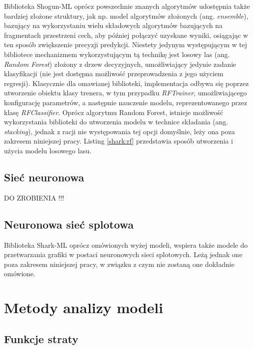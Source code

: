 Biblioteka Shogun-ML oprócz powszechnie znanych algorytmów udostępnia także bardziej złożone struktury, jak np. model algorytmów złożonych (ang. \textit{ensemble}), bazujący na wykorzystaniu wielu składowych algorytmów bazujących na fragmentach przestrzeni cech, aby później połączyć uzyskane wyniki, osiągając w ten sposób zwiększenie precyzji predykcji. Niestety jedynym występującym w tej bibliotece mechanizmem wykorzystującym tą technikę jest losowy las (ang. \textit{Random Forest}) złożony z drzew decyzyjnych, umożliwiający jedynie zadanie klasyfikacji (nie jest dostępna możliwość przeprowadzenia z jego użyciem regresji). Klasycznie dla omawianej biblioteki, implementacja odbywa się poprzez utworzenie obiektu klasy trenera, w tym przypadku \textit{RFTrainer}, umożliwiającego konfigurację parametrów, a następnie nauczenie modelu, reprezentowanego przez klasę \textit{RFClassifier}. Oprócz algorytmu Random Forest, istnieje możliwość wykorzystania biblioteki do utworzenia modelu w technice składania (ang. \textit{stacking}), jednak z racji nie występowania tej opcji domyślnie, leży ona poza zakresem niniejszej pracy. Listing \ref{shark:rf} przedstawia sposób utworzenia i użycia modelu losowego lasu.


\subsection{Sieć neuronowa}

DO ZROBIENIA !!!

\subsection{Neuronowa sieć splotowa}

Biblioteka Shark-ML oprócz omówionych wyżej modeli, wspiera także modele do przetwarzania grafiki w postaci neuronowych sieci splotowych. Leżą jednak one poza zakresem niniejszej pracy, w związku z czym nie zostaną one dokładnie omówione.

\section{Metody analizy modeli}

\subsection{Funkcje straty}

